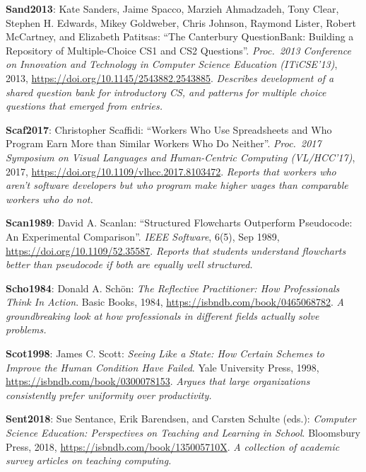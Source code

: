\textbf{\hypertarget{b:Sand2013}{Sand2013}\label{b:Sand2013}}: Kate Sanders, Jaime Spacco, Marzieh Ahmadzadeh, Tony Clear, Stephen H. Edwards, Mikey Goldweber, Chris Johnson, Raymond Lister, Robert McCartney, and Elizabeth Patitsas: ``The Canterbury QuestionBank: Building a Repository of Multiple-Choice CS1 and CS2 Questions''. \emph{Proc.\ 2013 Conference on Innovation and Technology in Computer Science Education (ITiCSE'13)}, 2013, \url{https://doi.org/10.1145/2543882.2543885}. \emph{Describes development of a shared question bank for introductory CS, and patterns for multiple choice questions that emerged from entries.}

\textbf{\hypertarget{b:Scaf2017}{Scaf2017}\label{b:Scaf2017}}: Christopher Scaffidi: ``Workers Who Use Spreadsheets and Who Program Earn More than Similar Workers Who Do Neither''. \emph{Proc.\ 2017 Symposium on Visual Languages and Human-Centric Computing (VL/HCC'17)}, 2017, \url{https://doi.org/10.1109/vlhcc.2017.8103472}. \emph{Reports that workers who aren't software developers but who program make higher wages than comparable workers who do not.}

\textbf{\hypertarget{b:Scan1989}{Scan1989}\label{b:Scan1989}}: David A. Scanlan: ``Structured Flowcharts Outperform Pseudocode: An Experimental Comparison''. \emph{IEEE Software}, 6(5), Sep 1989, \url{https://doi.org/10.1109/52.35587}. \emph{Reports that students understand flowcharts better than pseudocode if both are equally well structured.}

\textbf{\hypertarget{b:Scho1984}{Scho1984}\label{b:Scho1984}}: Donald A. Schön: \emph{The Reflective Practitioner: How Professionals Think In Action}. Basic Books, 1984, \url{https://isbndb.com/book/0465068782}. \emph{A groundbreaking look at how professionals in different fields actually solve problems.}

\textbf{\hypertarget{b:Scot1998}{Scot1998}\label{b:Scot1998}}: James C. Scott: \emph{Seeing Like a State: How Certain Schemes to Improve the Human Condition Have Failed}. Yale University Press, 1998, \url{https://isbndb.com/book/0300078153}. \emph{Argues that large organizations consistently prefer uniformity over productivity.}

\textbf{\hypertarget{b:Sent2018}{Sent2018}\label{b:Sent2018}}: Sue Sentance, Erik Barendsen, and Carsten Schulte (eds.): \emph{Computer Science Education: Perspectives on Teaching and Learning in School}. Bloomsbury Press, 2018, \url{https://isbndb.com/book/135005710X}. \emph{A collection of academic survey articles on teaching computing.}

